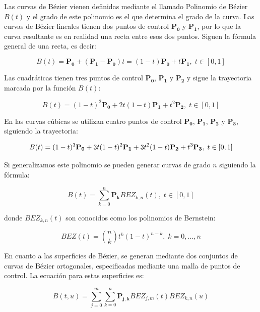 Las curvas de Bézier vienen definidas mediante el llamado Polinomio de Bézier
$B(t)$ y el grado de este polinomio es el que determina el grado de la curva.
Las curvas de Bézier lineales tienen dos puntos de control $\mathbf{P_0}$ y
$\mathbf{P_1}$, por lo que la curva resultante es en realidad una recta entre
esos dos puntos. Siguen la fórmula general de una recta, es decir:

\begin{equation}
	B(t) = \mathbf{P_0} + (\mathbf{P_1} - \mathbf{P_0})t = (1 - t)\mathbf{P_0} +
	t\mathbf{P_1}, \; t \in [0,1] \label{eq:1}
\end{equation}

Las cuadráticas tienen tres puntos de control $\mathbf{P_0}$, $\mathbf{P_1}$ y $\mathbf{P_2}$ y sigue la
trayectoria marcada por la función $B(t)$:

\begin{equation}
	B(t) = (1 - t)^2\mathbf{P_0} + 2t(1-t)\mathbf{P_1} + t^2\mathbf{P_2}, \; t
	\in [0,1] \label{eq:2}
\end{equation}

En las curvas cúbicas se utilizan cuatro  puntos de control $\mathbf{P_0}$,
$\mathbf{P_1}$, $\mathbf{P_2}$ y $\mathbf{P_3}$, siguiendo la trayectoria:

\begin{equation}
	B(t) = (1 - t)^3\mathbf{P_0} + 3t(1-t)^2\mathbf{P_1} + 3t^2(1-t)\mathbf{P_2}
	+ t^3\mathbf{P_3}, \; t \in [0,1] \label{eq:3}\\
\end{equation}

Si generalizamos este polinomio se pueden generar curvas de grado $n$ siguiendo
la fórmula:

\begin{equation}
	B(t) = \sum_{k = 0}^{n}\mathbf{P_k}BEZ_{k,n}(t) , \; t \in [0,1] \label{eq:4}
\end{equation}

donde $BEZ_{k,n}(t)$ son conocidos como los polinomios de Bernstein:

\begin{equation}
	BEZ(t) = \binom{n}{k}t^k(1-t)^{n-k}, \; k=0,\ldots,n \label{eq:5}
\end{equation}

En cuanto a las superficies de Bézier, se generan mediante dos conjuntos de
curvas de Bézier ortogonales, especificadas mediante una malla de puntos de
control. La ecuación para estas superficies es:

\begin{equation}
B(t, u) =
\sum_{j=0}^{m}{\sum_{k=0}^{n}{\mathbf{P_{j,k}}BEZ_{j,m}(t)BEZ_{k,n}(u)}}
\label{eq:6}
\end{equation}

